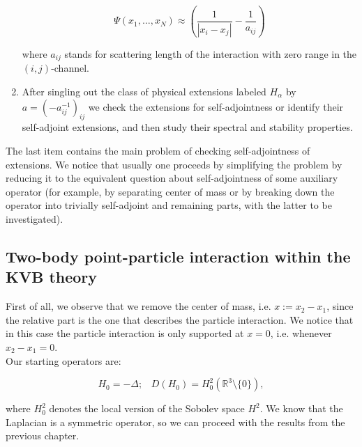 \documentclass[11pt, a4paper, german]{article}
\theoremstyle{plain}
\theoremstyle{definition}
\theoremstyle{remark}
\numberwithin{equation}{section}
\numberwithin{theorem}{section}
\begin{document}
\begin{enumerate}
\begin{equation}
\Psi(x_1, \dots, x_N) \approx \left( \frac{1}{|x_i - x_j|} - \frac{1}{a_{ij}} \right)
\end{equation}

where $a_{ij}$ stands for scattering length of the interaction with zero range in the $(i,j)$-channel.

\item

After singling out the class of physical extensions labeled $H_\alpha$ by $a=(-a_{ij}^{-1})_{ij}$ we check the extensions for self-adjointness or identify their self-adjoint extensions, and then study their spectral and stability properties.

\end{enumerate}

The last item contains the main problem of checking self-adjointness of extensions. We notice that usually one proceeds by simplifying the problem by reducing it to the equivalent question about self-adjointness of some auxiliary operator (for example, by separating center of mass or by breaking down the operator into trivially self-adjoint and remaining parts, with the latter to be investigated).

\subsection{Two-body point-particle interaction within the KVB theory}

First of all, we observe that we remove the center of mass, i.e. $x:= x_2-x_1$, since the relative part is the one that describes the particle interaction. We notice that in this case the particle interaction is only supported at $x=0$, i.e. whenever $x_2-x_1 = 0$.\\

Our starting operators are:

\begin{equation}
H_0 = -\Delta; \,\,\,\,\, D(H_0) = H^2_0(\mathbb R ^3 \setminus \{0\}),
\end{equation}

where $H^2_0$ denotes the local version of the Sobolev space $H^2$. We know that the Laplacian is a symmetric operator, so we can proceed with the results from the previous chapter.
\end{document}
